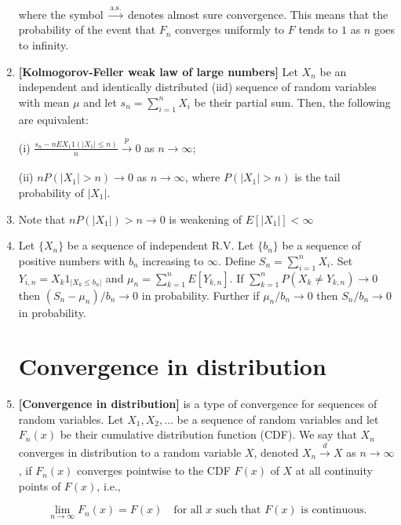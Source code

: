 \documentclass[12pt,oneside]{book}
\begin{document}
\begin{enumerate}
where the symbol $\overset{\text{a.s.}}{\longrightarrow}$ denotes almost sure convergence. This means that the probability of the event that $F_n$ converges uniformly to $F$ tends to $1$ as $n$ goes to infinity.

\item \textbf{[Kolmogorov-Feller weak law of large numbers]} Let ${X_n}$ be an independent and identically distributed (iid) sequence of random variables with mean $\mu$ and let $s_n = \sum_{i=1}^n X_i$ be their partial sum. Then, the following are equivalent:

(i) $\frac{s_n - nE{X_1 1(|X_1| \leq n)}}{n} \xrightarrow[]{p} 0$ as $n \rightarrow \infty$;

(ii) $nP(|X_1| > n) \rightarrow 0$ as $n \rightarrow \infty$, where $P(|X_1| > n)$ is the tail probability of $|X_1|$.

\item Note that $nP(|X_1|)>n\to 0$ is weakening of $E[|X_1|]<\infty$


\item Let $\{X_n\}$ be a sequence of independent R.V. Let $\{b_n\}$ be a sequence of positive numbers with $b_n$ increasing to $\infty$. Define $S_n=\sum_{i=1}^n X_i$. Set $Y_{i,n}=X_k1_{|X_k\leq b_n|}$ and $\mu_n=\sum_{k=1}^nE[Y_{k,n}]$. If $\sum_{k=1}^n P(X_k\ne Y_{k,n})\to 0$ then $(S_n-\mu_n)/b_n\to 0$ in probability. Further if $\mu_n/b_n\to0$ then $S_n/b_n\to 0$ in probability.







\chapter{Convergence in distribution}

\item \textbf{[Convergence in distribution]} is a type of convergence for sequences of random variables. Let $X_1, X_2, \ldots$ be a sequence of random variables and let $F_n(x)$ be their cumulative distribution function (CDF). We say that $X_n$ converges in distribution to a random variable $X$, denoted $X_n \xrightarrow[]{d} X$ as $n \rightarrow \infty$, if $F_n(x)$ converges pointwise to the CDF $F(x)$ of $X$ at all continuity points of $F(x)$, i.e.,

\begin{equation*}
\lim_{n\rightarrow \infty}F_n(x) = F(x) \quad \text{for all } x \text{ such that } F(x) \text{ is continuous}.
\end{equation*}


\end{enumerate}
\end{document}
